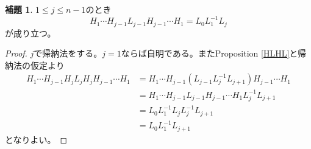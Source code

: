 \documentclass[uplatex, a4paper, dvipdfmx]{jsarticle}
\theoremstyle{definition}
\newtheorem{lemma}[theorem]{補題}
\begin{document}
\begin{lemma}
    $1 \leq j \leq n-1$のとき
    \begin{equation}
        H_1 \cdots H_{j-1}L_{j-1}H_{j-1} \cdots H_1 = L_0L_1^{-1}L_j
    \end{equation}
    が成り立つ。
\end{lemma}
\begin{proof}
    $j$で帰納法をする。$j=1$ならば自明である。またProposition \ref{HLHL}と帰納法の仮定より
    \begin{align}
        H_1 \cdots H_{j-1}H_jL_{j}H_jH_{j-1} \cdots H_1 & =H_1 \cdots H_{j-1}(L_{j-1}L_j^{-1}L_{j+1})H_{j-1}\cdots H_1 \\
                                                        & =H_1 \cdots H_{j-1}L_{j-1}H_{j-1} \cdots H_1 L_j^{-1}L_{j+1} \\
                                                        & =L_0L_1^{-1}L_jL_j^{-1}L_{j+1}                               \\
                                                        & =L_0L_1^{-1}L_{j+1}
    \end{align}
    となりよい。
\end{proof}
\end{document}
